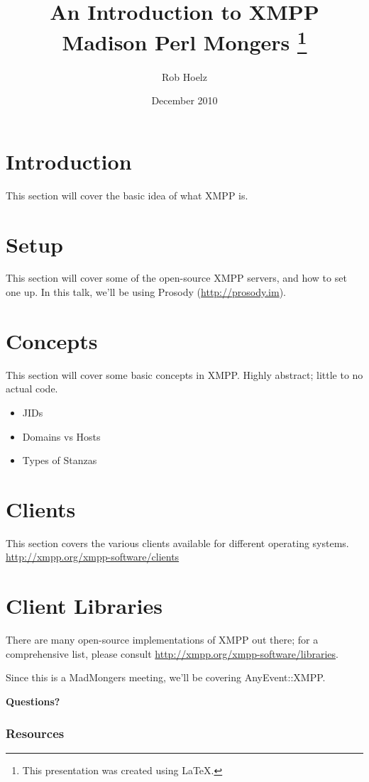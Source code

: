 \documentclass{article}
\title{
  \indent An Introduction to XMPP \newline
  Madison Perl Mongers
  \thanks{This presentation was created using \LaTeX.}}
\author{Rob Hoelz}
\date{December 2010}
\begin{document}
\maketitle

\newpage
\part{Introduction}

\newpage
This section will cover the basic idea of what XMPP is.

\newpage
\part{Setup}

\newpage
This section will cover some of the open-source XMPP servers, and
how to set one up.  In this talk, we'll be using Prosody (\url{http://prosody.im}).

\newpage
\part{Concepts}

\newpage
This section will cover some basic concepts in XMPP.  Highly abstract; little to no
actual code.

\begin{itemize}
\item JIDs
\item Domains vs Hosts
\item Types of Stanzas
\end{itemize}

\newpage
\part{Clients}

\newpage
This section covers the various clients available for different operating systems.
\url{http://xmpp.org/xmpp-software/clients}

\newpage
\part{Client Libraries}

\newpage
There are many open-source implementations of XMPP out there; for a comprehensive list,
please consult \url{http://xmpp.org/xmpp-software/libraries}.

\newpage
Since this is a MadMongers meeting, we'll be covering AnyEvent::XMPP.

\newpage

\vspace*{\fill}
\begin{center}
\textbf{\Huge Questions?}
\end{center}
\vspace*{\fill}

\newpage
\appendix
\section{Resources}
\end{document}
